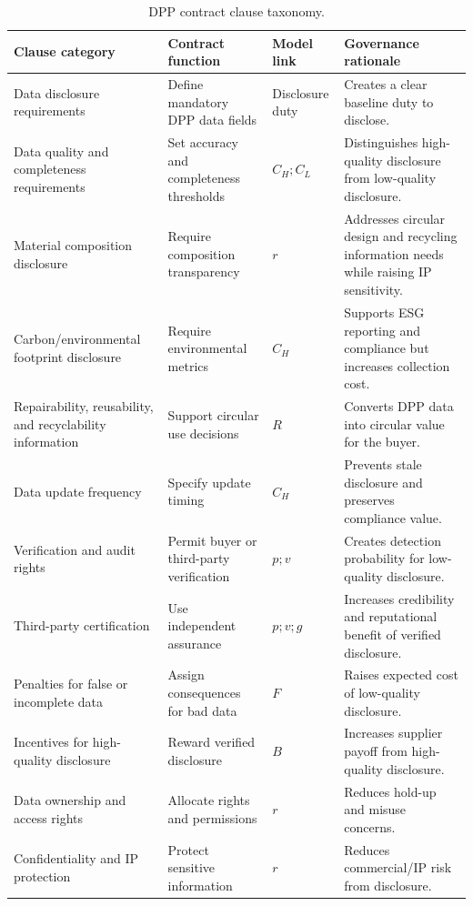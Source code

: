\documentclass[final,5p,times,authoryear]{elsarticle}
\begin{document}
\begin{table}[t]
\centering
\begingroup
\setlength{\tabcolsep}{3pt}
\tiny
\caption{DPP contract clause taxonomy.}
\label{tab:contract_clause_taxonomy}
\begin{tabular}{@{}p{}p{}p{}p{}@{}}
\toprule
Clause category & Contract function & Model link & Governance rationale \\
\midrule
Data disclosure requirements & Define mandatory DPP data fields & Disclosure duty & Creates a clear baseline duty to disclose. \\
Data quality and completeness requirements & Set accuracy and completeness thresholds & $C_H; C_L$ & Distinguishes high-quality disclosure from low-quality disclosure. \\
Material composition disclosure & Require composition transparency & $r$ & Addresses circular design and recycling information needs while raising IP sensitivity. \\
Carbon/environmental footprint disclosure & Require environmental metrics & $C_H$ & Supports ESG reporting and compliance but increases collection cost. \\
Repairability, reusability, and recyclability information & Support circular use decisions & $R$ & Converts DPP data into circular value for the buyer. \\
Data update frequency & Specify update timing & $C_H$ & Prevents stale disclosure and preserves compliance value. \\
Verification and audit rights & Permit buyer or third-party verification & $p; v$ & Creates detection probability for low-quality disclosure. \\
Third-party certification & Use independent assurance & $p; v; g$ & Increases credibility and reputational benefit of verified disclosure. \\
Penalties for false or incomplete data & Assign consequences for bad data & $F$ & Raises expected cost of low-quality disclosure. \\
Incentives for high-quality disclosure & Reward verified disclosure & $B$ & Increases supplier payoff from high-quality disclosure. \\
Data ownership and access rights & Allocate rights and permissions & $r$ & Reduces hold-up and misuse concerns. \\
Confidentiality and IP protection & Protect sensitive information & $r$ & Reduces commercial/IP risk from disclosure. \\

\end{tabular}
\end{table}
\end{document}
